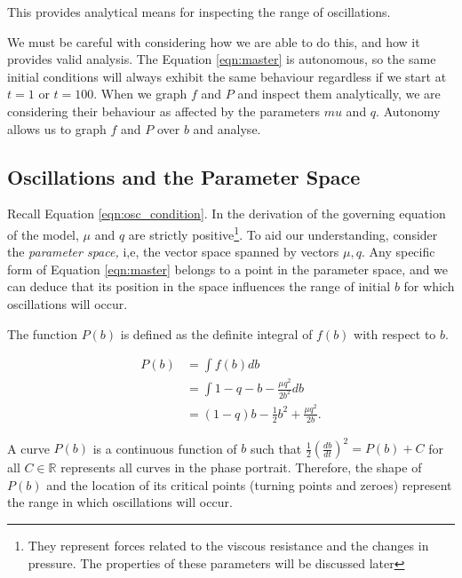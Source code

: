 \documentclass{article}
\begin{document}

This provides analytical means for inspecting the range of oscillations.

We must be careful with considering how we are able to do this, and how it provides valid analysis.
The Equation \ref{eqn:master} is autonomous,
so the same initial conditions will always exhibit the same behaviour regardless if we start at $t=1$ or $t=100$.
When we graph $f$ and $P$ and inspect them analytically, we are considering their behaviour as affected by the parameters $mu$ and $q$.
Autonomy allows us to graph $f$ and $P$ over $b$ and analyse.

\subsection{Oscillations and the Parameter Space}

Recall Equation \ref{eqn:osc_condition}. In the derivation of the governing equation of the model, $\mu$ and $q$ are strictly positive\footnote{They represent forces related to the viscous resistance and the changes in pressure. The properties of these parameters will be discussed later}.
To aid our understanding, consider the \textit{parameter space,} i,e, the vector space spanned by vectors $\mu, q$.
Any specific form of Equation \ref{eqn:master} belongs to a point in the parameter space,
and we can deduce that its position in the space influences the range of initial $b$ for which oscillations will occur. 


The function $P(b)$ is defined as the definite integral of $f(b)$ with respect to $b$.

\begin{equation}
    \begin{aligned}
        P(b) &= \int f(b) db \\
        &= \int 1 - q - b - \frac{\mu q^2}{2 b^2} db \\
        &= (1-q)b - \frac{1}{2}b^2 + \frac{\mu q^2}{2b}.
    \end{aligned}
    \label{eqn:ke_integral}
\end{equation}

A curve $P(b)$ is a continuous function of $b$ such that $\frac{1}{2}\left(\frac{db}{dt}\right)^2 = P(b) +C$ for all $C \in \mathds{R}$
represents all curves in the phase portrait. Therefore, the shape of $P(b)$ and the location of its critical points (turning points and zeroes)
represent the range in which oscillations will occur.
\end{document}
